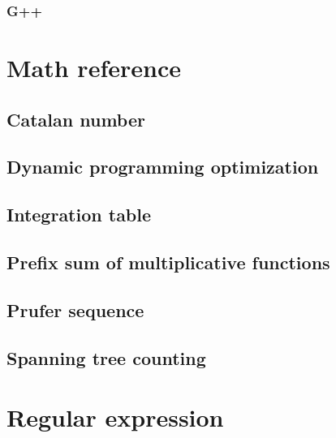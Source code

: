 \documentclass[UTF8,a4paper]{report}
\begin{document}
				\subsubsection{G++}
					
		\section{Math reference}
			\subsection{Catalan number}
				
			\subsection{Dynamic programming optimization}
				
			\subsection{Integration table}
				
			\subsection{Prefix sum of multiplicative functions}
				
			\subsection{Prufer sequence}
				
			\subsection{Spanning tree counting}
				
		\section{Regular expression}
				
			
\end{document}
